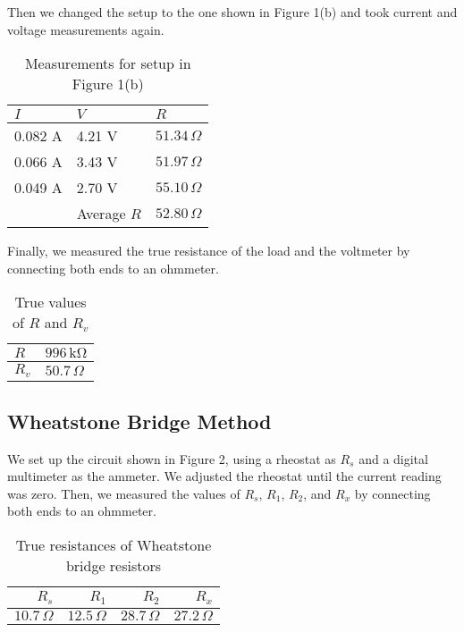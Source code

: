 \documentclass[11pt, titlepage, letterpaper, twoside]{article}
\begin{document}
Then we changed the setup to the one shown in Figure 1(b) and took current and voltage measurements again.

\begin{table}[h!]
\centering
\caption{Measurements for setup in Figure 1(b)}
\begin{tabular}{|l|l|l|}
\hline
$I$     & $V$         & $R$             \\ \hline
0.082 A & 4.21 V      & $51.34\,\Omega$ \\ \hline
0.066 A & 3.43 V      & $51.97\,\Omega$ \\ \hline
0.049 A & 2.70 V      & $55.10\,\Omega$ \\ \hline
        & Average $R$ & $52.80\,\Omega$ \\ \hline
\end{tabular}
\end{table}

Finally, we measured the true resistance of the load and the voltmeter by connecting both ends to an ohmmeter.

\begin{table}[h!]
\centering
\caption{True values of $R$ and $R_v$}
\begin{tabular}{|l|l|}
\hline
$R$   & $996\,\mathrm{k\Omega}$ \\ \hline
$R_v$ & $50.7\,\Omega$          \\ \hline
\end{tabular}
\end{table}


\subsection{Wheatstone Bridge Method}

We set up the circuit shown in Figure 2, using a rheostat as $R_s$ and a digital multimeter as the ammeter. We adjusted the rheostat until the current reading
was zero. Then, we measured the values of $R_s$, $R_1$, $R_2$, and $R_x$ by connecting both ends to an ohmmeter.

\begin{table}[h!]
\centering
\caption{True resistances of Wheatstone bridge resistors}
\begin{tabular}{| r | r | r | r |}
  \hline
  $R_s$          & $R_1$          & $R_2$          & $R_x$          \\ \hline
  $10.7\,\Omega$ & $12.5\,\Omega$ & $28.7\,\Omega$ & $27.2\,\Omega$ \\ \hline
\end{tabular}
\end{table}
\end{document}
